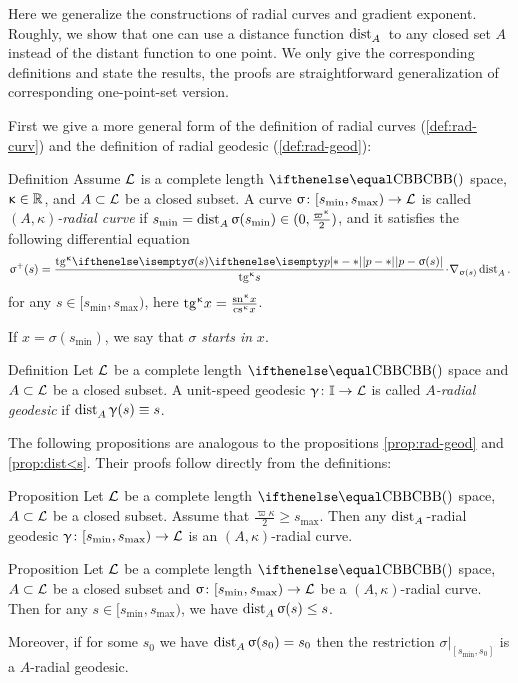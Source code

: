 Here we generalize the constructions of radial curves and gradient exponent.
Roughly, we show that one can use a distance function 
$\mathop{\rm dist}\nolimits_{A}^{{}}{}{}$ to any closed set $A$ instead of the distant function to one point.
We only give the corresponding definitions and state the results,
the proofs are straightforward generalization of corresponding one-point-set version. 

First we give a more general form of the definition of radial curves (\ref{def:rad-curv}) and the definition of radial geodesic (\ref{def:rad-geod}):

\begin{thm}{Definition}
Assume $\mathcal{L}$ is a complete length $\Alex{}$ space, 
$\kappa\in\RR$, 
and $A\subset \spc{L}$ be a closed subset.
A curve $\sigma\:[s_{\min},s_{\max})\to \spc{L}$  is called 
\emph{$(A,\kappa)$-radial curve} 
if
$s_{\min}
\z=
\distfun{A}{\sigma(s_{\min})}{}\in(0,\tfrac{\varpi\kappa}2)$, 
and it satisfies the following differential equation
\[\sigma^+(s)
\z=
\frac{\tg\kappa\dist[{{}}]{p}{\sigma(s)}{}}{\tg\kappa s}
\cdot
\nabla_{\sigma(s)}\distfun{A}{}{}.\]
for any $s\in[s_{\min},s_{\max})$, here $\mathrm{tg}^{\upkappa} x=\frac{\mathrm{sn}^{\upkappa} x}{\mathrm{cs}^{\upkappa} x}$.

If $x=\sigma(s_{\min})$, we say that $\sigma$ \emph{starts in}  $x$.
\end{thm}

\begin{thm}{Definition}
Let $\mathcal{L}$ be a complete length $\Alex{}$ space
and $A\subset \spc{L}$ be a closed subset.
A unit-speed geodesic  $\gamma\:\II\to \spc{L}$  is called 
\emph{$A$-radial geodesic} if 
$\mathop{\rm dist}\nolimits_{A}^{{}}{\upgamma(s)}{}\equiv s$.
\end{thm}

The following propositions are analogous to the propositions \ref{prop:rad-geod} and \ref{prop:dist<s}.
Their proofs follow directly from the definitions: 

\begin{thm}{Proposition}
Let $\mathcal{L}$ be a complete length $\Alex{}$ space,
$A\subset\spc{L}$ be a closed subset.
Assume that 
$\tfrac{\varpi\kappa}{2}
\ge 
s_{\max}$.
Then any $\mathop{\rm dist}\nolimits_{A}^{{}}{}{}$-radial geodesic 
$\gamma\:[s_{\min},s_{\max})
\to 
\spc{L}$ 
is an $(A,\kappa)$-radial curve.
\end{thm}

\begin{thm}{Proposition}
Let $\mathcal{L}$ be a complete length $\Alex{}$ space,
$A\subset\spc{L}$ be a closed subset 
and $\sigma\:[s_{\min},s_{\max})\to \spc{L}$ be a $(A,\kappa)$-radial curve.
Then for any $s\in [s_{\min},s_{\max})$, 
we have $\distfun{A}{\sigma(s)}{}\le s$.

Moreover, if for some $s_0$ we have $\mathop{\rm dist}\nolimits_{A}^{{}}{\upsigma(s_0)}{}= s_0$ 
then the restriction $\sigma|_{[s_{\min},s_0]}$ is a $A$-radial geodesic.
\end{thm}

